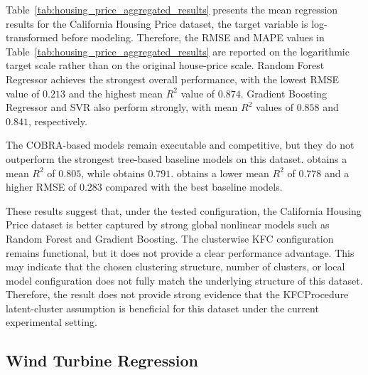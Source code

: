 \hs Table~\ref{tab:housing_price_aggregated_results} presents the mean regression results for the California Housing Price dataset, the target variable is log-transformed before modeling. Therefore, the RMSE and MAPE values in Table~\ref{tab:housing_price_aggregated_results} are reported on the logarithmic target scale rather than on the original house-price scale. Random Forest Regressor achieves the strongest overall performance, with the lowest RMSE value of $0.213$ and the highest mean $R^2$ value of $0.874$. Gradient Boosting Regressor and SVR also perform strongly, with mean $R^2$ values of $0.858$ and $0.841$, respectively.

The COBRA-based models remain executable and competitive, but they do not outperform the strongest tree-based baseline models on this dataset.  obtains a mean $R^2$ of $0.805$, while  obtains $0.791$.  obtains a lower mean $R^2$ of $0.778$ and a higher RMSE of $0.283$ compared with the best baseline models.

These results suggest that, under the tested configuration, the California Housing Price dataset is better captured by strong global nonlinear models such as Random Forest and Gradient Boosting. The clusterwise KFC configuration remains functional, but it does not provide a clear performance advantage. This may indicate that the chosen clustering structure, number of clusters, or local model configuration does not fully match the underlying structure of this dataset. Therefore, the result does not provide strong evidence that the KFCProcedure latent-cluster assumption is beneficial for this dataset under the current experimental setting.

\subsection{Wind Turbine Regression}


